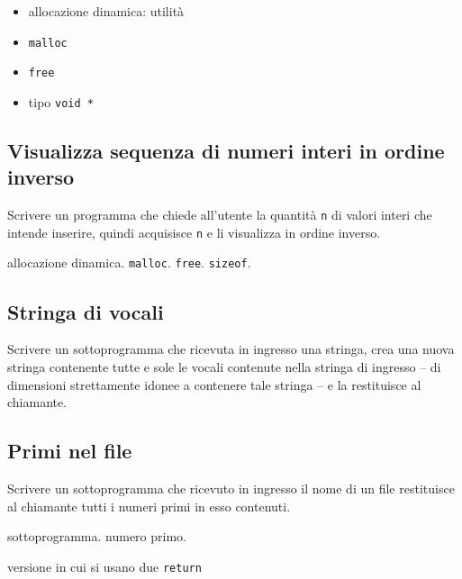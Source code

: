 \begin{itemize}
\item allocazione dinamica: utilit\`a
\item \texttt{malloc}
\item \texttt{free}
\item tipo \texttt{void *}
\end{itemize}

\subsection{Visualizza sequenza di numeri interi in ordine inverso}
Scrivere un programma che chiede all'utente la quantit\`a \texttt{n} di valori interi che intende inserire, quindi acquisisce \texttt{n} e li visualizza in ordine inverso.

\begin{tags}
allocazione dinamica. \texttt{malloc}. \texttt{free}. \texttt{sizeof}.
\end{tags}


\subsection{Stringa di vocali}
Scrivere un sottoprogramma che ricevuta in ingresso una stringa, crea una nuova stringa contenente tutte e sole le vocali contenute nella stringa di ingresso -- di dimensioni strettamente idonee a contenere tale stringa -- e la restituisce al chiamante.



\subsection{Primi nel file}
Scrivere un sottoprogramma che ricevuto in ingresso il nome di un file restituisce al chiamante tutti i numeri primi in esso contenuti.

\begin{tags}
sottoprogramma. numero primo.
\end{tags}


versione in cui si usano due \texttt{return}

